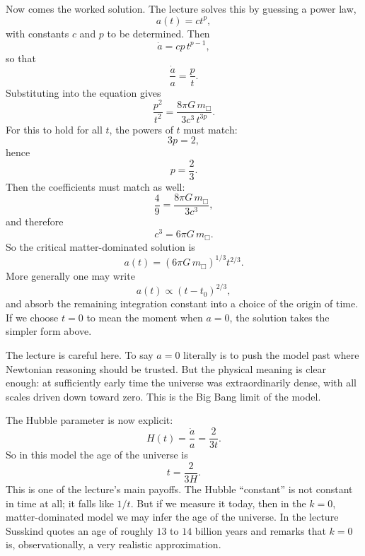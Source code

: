 Now comes the worked solution. The lecture solves this by guessing a power law,
\begin{equation}
a(t)=ct^p,
\end{equation}
with constants \(c\) and \(p\) to be determined. Then
\begin{equation}
\dot a = cp\,t^{p-1},
\end{equation}
so that
\begin{equation}
\frac{\dot a}{a}=\frac{p}{t}.
\end{equation}
Substituting into the equation gives
\begin{equation}
\frac{p^2}{t^2}=\frac{8\pi G\,m_{\Box}}{3c^3\,t^{3p}}.
\end{equation}
For this to hold for all \(t\), the powers of \(t\) must match:
\begin{equation}
3p=2,
\end{equation}
hence
\begin{equation}
p=\frac{2}{3}.
\end{equation}
Then the coefficients must match as well:
\begin{equation}
\frac{4}{9}=\frac{8\pi G\,m_{\Box}}{3c^3},
\end{equation}
and therefore
\begin{equation}
c^3=6\pi G\,m_{\Box}.
\end{equation}
So the critical matter-dominated solution is
\begin{equation}
a(t)=\left(6\pi G\,m_{\Box}\right)^{1/3}t^{2/3}.
\end{equation}
More generally one may write
\begin{equation}
a(t)\propto (t-t_0)^{2/3},
\end{equation}
and absorb the remaining integration constant into a choice of the origin of time. If we choose \(t=0\) to mean the moment when \(a=0\), the solution takes the simpler form above.

The lecture is careful here. To say \(a=0\) literally is to push the model past where Newtonian reasoning should be trusted. But the physical meaning is clear enough: at sufficiently early time the universe was extraordinarily dense, with all scales driven down toward zero. This is the Big Bang limit of the model.

The Hubble parameter is now explicit:
\begin{equation}
H(t)=\frac{\dot a}{a}=\frac{2}{3t}.
\end{equation}
So in this model the age of the universe is
\begin{equation}
t=\frac{2}{3H}.
\end{equation}
This is one of the lecture's main payoffs. The Hubble ``constant'' is not constant in time at all; it falls like \(1/t\). But if we measure it today, then in the \(k=0\), matter-dominated model we may infer the age of the universe. In the lecture Susskind quotes an age of roughly \(13\) to \(14\) billion years and remarks that \(k=0\) is, observationally, a very realistic approximation.


